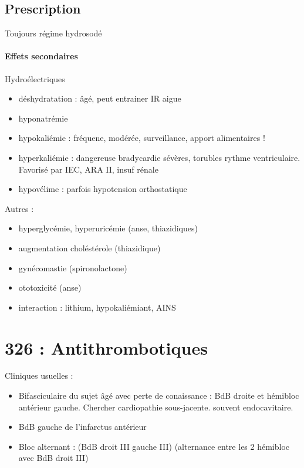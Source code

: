 \documentclass{article}
\begin{document}
\subsection{Prescription}
Toujours régime hydrosodé

\paragraph{Effets secondaires}
Hydroélectriques 
\begin{itemize}
  \item déshydratation : âgé, peut entrainer IR aigue
  \item hyponatrémie 
  \item hypokaliémie : fréquene, modérée, surveillance, apport alimentaires
    !
  \item hyperkaliémie : dangereuse \danger{} bradycardie sévères, torubles
    rythme ventriculaire. Favorisé par IEC, ARA II, insuf rénale
  \item hypovélime : parfois hypotension orthostatique
\end{itemize}
Autres : 
\begin{itemize}
  \item hyperglycémie, hyperuricémie (anse, thiazidiques)
  \item augmentation choléstérole (thiazidique)
  \item gynécomastie (spironolactone)
  \item ototoxicité (anse)
  \item interaction : lithium, hypokaliémiant, AINS
\end{itemize}







\section{326 : Antithrombotiques}%
\label{sec:326_antithrombotiques}


Cliniques usuelles : 
\begin{itemize}
  \item Bifasciculaire du sujet âgé avec perte de conaissance : BdB droite et
    hémibloc antérieur gauche. Chercher cardiopathie sous-jacente. souvent
    endocavitaire.
  \item BdB gauche de l'infarctus antérieur
  \item Bloc alternant : (BdB droit III \land{} gauche III) \lor{} (alternance
    entre les 2 hémibloc avec BdB droit III)
\end{itemize}
\end{document}
